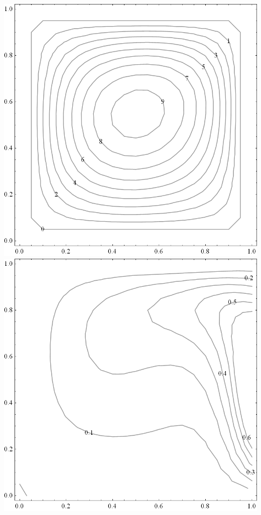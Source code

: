 \documentclass[a4paper, 12pt]{article}
\begin{document}
    \includegraphics[scale=0.25]{images/psi_10k.png}
    \qquad
    \includegraphics[scale=0.25]{images/t_10k.png}
\end{document}
